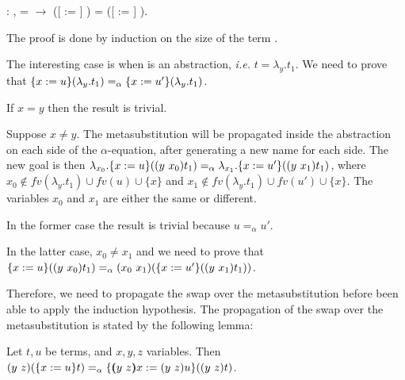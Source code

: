 \begin{coqdoccode}
\coqdocemptyline
\coqdocnoindent
{} : \coqdockw{\ensuremath{\forall}}    ,  =  \ensuremath{\rightarrow} ([ := ] ) = ([ := ] ).\coqdoceol
\end{coqdoccode}
 The proof is done by induction on the size of the term .
\begin{coqdoccode}
\end{coqdoccode}
The interesting case is when  is an abstraction, {\it i.e.} $t = \lambda_y.t_1$. We need to prove that $\metasub{(\lambda_y.t_1)}{x}{u} =_\alpha \metasub{(\lambda_y.t_1)}{x}{u'}$.
\begin{coqdoccode}
\end{coqdoccode}
If $x = y$ then the result is trivial.
\begin{coqdoccode}
\end{coqdoccode}
Suppose $x \neq y$. The metasubstitution will be propagated inside the abstraction on each side of the $\alpha$-equation, after generating a new name for each side. The new goal is then $\lambda_{x_0}.\metasub{(\swap{y}{x_0}{t_1})}{x}{u} =_\alpha \lambda_{x_1}.\metasub{(\swap{y}{x_1}{t_1})}{x}{u'}$, where $x_0 \notin fv(\lambda_y.t_1) \cup fv(u) \cup \{x\}$ and $x_1 \notin fv(\lambda_y.t_1) \cup fv(u') \cup \{x\}$. The variables $x_0$ and $x_1$ are either the same or different.
\begin{coqdoccode}
\end{coqdoccode}
In the former case the result is trivial because $u =_\alpha u'$. 
\begin{coqdoccode}
\end{coqdoccode}
In the latter case, $x_0 \neq x_1$ and we need to prove that $\metasub{(\swap{y}{x_0}{t_1})}{x}{u} =_\alpha \swap{x_0}{x_1}{(\metasub{(\swap{y}{x_1}{t_1})}{x}{u'})}$.
\begin{coqdoccode}
\end{coqdoccode}
Therefore, we need to propagate the swap over the metasubstitution before been able to apply the induction hypothesis. The propagation of the swap over the metasubstitution is stated by the following lemma:


\begin{lemma} Let $t,u$ be terms, and $x,y,z$ variables. Then
 $\swap{y}{z}{(\metasub{t}{x}{u})} =_\alpha \metasub{(\swap{y}{z}{t})}{\vswap{y}{z}{x}}{\swap{y}{z}{u}}$.
\end{lemma}


